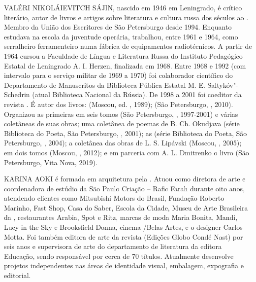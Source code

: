 \medskip

\noindent{}VALÉRI NIKOLÁIEVITCH SÁJIN, nascido em 1946 em Leningrado, é crítico
literário, autor de livros e artigos sobre literatura e cultura russa
dos séculos  ao .
Membro da União dos Escritores de São
Petersburgo desde 1994. Enquanto estudava na escola da juventude
operária, trabalhou, entre 1961 e 1964, como serralheiro ferramenteiro
numa fábrica de equipamentos radiotécnicos. A partir de 1964 cursou a
Faculdade de Língua e Literatura Russa do Instituto Pedagógico Estatal
de Leningrado A. I. Herzen, finalizada em 1968. Entre 1968 e 1992 (com
intervalo para o serviço militar de 1969 a 1970) foi colaborador
científico do Departamento de Manuscritos da Biblioteca Pública Estatal
M. E. Saltykóv"-Schedrin (atual Biblioteca Nacional da Rússia). De 1998 a
2001 foi coeditor da revista {}. É autor dos livros: {} (Moscou, ed.
{}, 1989); {} (São Petersburgo, {}, 2010). Organizou as
primeiras {} em seis tomos (São
Petersburgo, {}, 1997-2001) e várias
coletâneas de suas obras; uma coletânea de poemas de B. Ch. Okudjava
(série Biblioteca do Poeta, São Petersburgo, {}, 2001); as {} (série
Biblioteca do Poeta, São Petersburgo, {},
2004); a coletânea das obras de L. S. Lipávski {}
(Moscou, {}, 2005); {} em
dois tomos (Moscou, {}, 2012); e em
parceria com A. L. Dmitrenko o livro {} (São Petersburgo,
Vita Nova, 2019).

\medskip

\noindent{}KARINA AOKI é formada em arquitetura pela . Atuou como diretora de arte e coordenadora de estúdio da São Paulo Criação – Rafic Farah
durante oito anos, atendendo clientes como Mitsubishi Motors do Brasil,
Fundação Roberto Marinho, Fast Shop, Casa do Saber, Escola da Cidade,
Museu de Arte Brasileira da , restaurantes Arabia, Spot e Ritz,
marcas de moda Maria Bonita, Mandi, Lucy in the Sky e Brooksfield Donna,
cinema /Belas Artes, e o designer Carlos Motta. Foi também editora
de arte da revista {} (Edições Globo Condé Nast) por seis anos e
supervisora de arte do departamento de literatura da editora 
Educação, sendo responsável por cerca de 70 títulos. Atualmente
desenvolve projetos independentes nas áreas de identidade visual,
embalagem, expografia e editorial.

